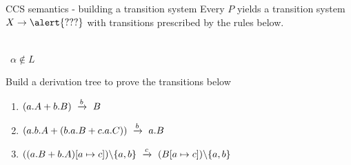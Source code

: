 \documentclass[aspectratio=169]{beamer}
\begin{document}
\exerciseBack
\begin{slide}{CCS semantics - building a transition system}
\small 
Every $P$ yields a transition system $X \to {\alert{???}}$ with transitions prescribed by the rules below.

\vspace*{-1mm}
\centering
\newcommand{\msep}{~~~~~~}

\msep
{} %
\msep
{} %
\\[3mm]
~${\alpha%
                                                                  \notin L}$
\msep
{}
\\[6mm]

\pause

\begin{exampleblock}{\exercise Build a derivation tree to prove the transitions below}
  \vspace*{-2mm}
  \begin{enumerate}
    \item $(a.A + b.B) ~\xrightarrow{b}~ B$
    \item $(a.b.A + (b.a.B + c.a.C)) ~\xrightarrow{b}~ a.B$
    \item $((a.B + b.A)[a \mapsto c])\backslash\{a,b\} ~\xrightarrow{c}~ (B[a\mapsto c])\backslash\{a,b\}$
  \end{enumerate}
\end{exampleblock}

\end{slide}
\end{document}
